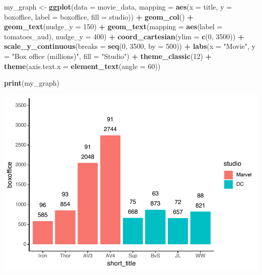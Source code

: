 \documentclass[
]{krantz}
\makeatletter
\newenvironment{Shaded}{\begin{snugshade}}{\end{snugshade}}
\newcommand{\DataTypeTok}[1]{\textcolor[rgb]{0.27,0.27,0.27}{#1}}
\newcommand{\DecValTok}[1]{\textcolor[rgb]{0.06,0.06,0.06}{#1}}
\newcommand{\KeywordTok}[1]{\textcolor[rgb]{0.27,0.27,0.27}{\textbf{#1}}}
\newcommand{\NormalTok}[1]{#1}
\newcommand{\OperatorTok}[1]{\textcolor[rgb]{0.43,0.43,0.43}{\textbf{#1}}}
\newcommand{\StringTok}[1]{\textcolor[rgb]{0.5,0.5,0.5}{#1}}
\newenvironment{kframe}{%
\medskip{}
\setlength{\fboxsep}{.8em}
 \def\at@end@of@kframe{}%
 \ifinner\ifhmode%
  \def\at@end@of@kframe{\end{minipage}}%
  \begin{minipage}{\columnwidth}%
 \fi\fi%
 \def\FrameCommand##1{\hskip\@totalleftmargin \hskip-\fboxsep
 \colorbox{shadecolor}{##1}\hskip-\fboxsep
     \hskip-\linewidth \hskip-\@totalleftmargin \hskip\columnwidth}%
 \MakeFramed {\advance\hsize-\width
   \@totalleftmargin\z@ \linewidth\hsize
   \@setminipage}}%
 {\par\unskip\endMakeFramed%
 \at@end@of@kframe}
\renewenvironment{Shaded}{\begin{kframe}}{\end{kframe}}
\makeatother
\begin{document}
\begin{Shaded}
\begin{Highlighting}[]
\NormalTok{my_graph <-}\StringTok{ }\KeywordTok{ggplot}\NormalTok{(}\DataTypeTok{data =}\NormalTok{ movie_data,}
           \DataTypeTok{mapping =} \KeywordTok{aes}\NormalTok{(}\DataTypeTok{x =}\NormalTok{ title,}
                         \DataTypeTok{y =}\NormalTok{ boxoffice,}
                         \DataTypeTok{label =}\NormalTok{ boxoffice, }
                         \DataTypeTok{fill =}\NormalTok{ studio)) }\OperatorTok{+}
\StringTok{  }\KeywordTok{geom_col}\NormalTok{() }\OperatorTok{+}
\StringTok{  }\KeywordTok{geom_text}\NormalTok{(}\DataTypeTok{nudge_y =} \DecValTok{150}\NormalTok{)  }\OperatorTok{+}
\StringTok{  }\KeywordTok{geom_text}\NormalTok{(}\DataTypeTok{mapping =} \KeywordTok{aes}\NormalTok{(}\DataTypeTok{label =}\NormalTok{ tomatoes_aud), }
            \DataTypeTok{nudge_y =} \DecValTok{400}\NormalTok{) }\OperatorTok{+}
\StringTok{  }\KeywordTok{coord_cartesian}\NormalTok{(}\DataTypeTok{ylim =} \KeywordTok{c}\NormalTok{(}\DecValTok{0}\NormalTok{, }\DecValTok{3500}\NormalTok{)) }\OperatorTok{+}
\StringTok{  }\KeywordTok{scale_y_continuous}\NormalTok{(}\DataTypeTok{breaks =} \KeywordTok{seq}\NormalTok{(}\DecValTok{0}\NormalTok{, }\DecValTok{3500}\NormalTok{, }\DataTypeTok{by =} \DecValTok{500}\NormalTok{)) }\OperatorTok{+}
\StringTok{  }\KeywordTok{labs}\NormalTok{(}\DataTypeTok{x =} \StringTok{"Movie"}\NormalTok{,}
       \DataTypeTok{y =} \StringTok{"Box office (millions)"}\NormalTok{,}
       \DataTypeTok{fill =} \StringTok{"Studio"}\NormalTok{) }\OperatorTok{+}
\StringTok{  }\KeywordTok{theme_classic}\NormalTok{(}\DecValTok{12}\NormalTok{) }\OperatorTok{+}
\StringTok{  }\KeywordTok{theme}\NormalTok{(}\DataTypeTok{axis.text.x =} \KeywordTok{element_text}\NormalTok{(}\DataTypeTok{angle =} \DecValTok{60}\NormalTok{))}

\KeywordTok{print}\NormalTok{(my_graph)}
\end{Highlighting}
\end{Shaded}

\includegraphics[width=0.65\linewidth]{bookdown_files/figure-latex/unnamed-chunk-124-1}
\end{document}
